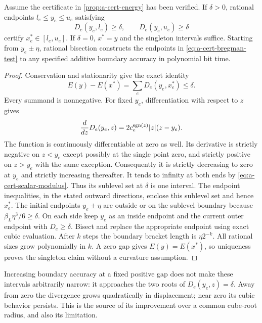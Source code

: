 \begin{proposition}
\label{prop:a-cert-bregman}
Assume the certificate in \cref{prop:a-cert-energy} has been verified.
If $\delta>0$, rational endpoints $l_e\le y_e\le u_e$ satisfying
\begin{equation}
 D_e(y_e,l_e)\ge\delta,\qquad D_e(y_e,u_e)\ge\delta
 \label{eq:a-cert-bregman-test}
\end{equation}
certify $x_e^*\in[l_e,u_e]$. If $\delta=0$, $x^*=y$ and the
singleton intervals suffice. Starting from $y_e\pm\eta$, rational
bisection constructs the endpoints in \eqref{eq:a-cert-bregman-test}
to any specified additive boundary accuracy in polynomial bit time.
\end{proposition}
\begin{proof}
Conservation and stationarity give the exact identity
\begin{equation}
 E(y)-E(x^*)=\sum_e D_e(y_e,x_e^*)\le\delta.
 \label{eq:a-cert-bregman-sum}
\end{equation}
Every summand is nonnegative. For fixed $y_e$, differentiation with
respect to $z$ gives
\[
 \frac{d}{dz}D_e(y_e,z)=2c_e^{\operatorname{sgn}(z)}|z|(z-y_e).
\]
The function is continuously differentiable at zero as well. Its
derivative is strictly negative on $z<y_e$ except possibly at the
single point zero, and strictly positive on $z>y_e$ with the same
exception. Consequently it is strictly decreasing to zero at $y_e$
and strictly increasing thereafter. It tends to infinity at both
ends by \eqref{eq:a-cert-scalar-modulus}. Thus its sublevel set at
$\delta$ is one interval. The endpoint inequalities, in the stated
outward directions, enclose this sublevel set and hence $x_e^*$.
The initial endpoints $y_e\pm\eta$ are outside or on the sublevel
boundary because $\beta_L\eta^3/6\ge\delta$. On each side keep
$y_e$ as an inside endpoint and the current outer endpoint with
$D_e\ge\delta$. Bisect and replace the appropriate endpoint using
exact cubic evaluation. After $k$ steps the boundary bracket length
is $\eta2^{-k}$. All rational sizes grow polynomially in $k$.
A zero gap gives $E(y)=E(x^*)$, so uniqueness proves the singleton
claim without a curvature assumption.
\end{proof}

Increasing boundary accuracy at a fixed positive gap does not make
these intervals arbitrarily narrow: it approaches the two roots of
$D_e(y_e,z)=\delta$. Away from zero the divergence grows quadratically
in displacement; near zero its cubic behavior persists. This is the
source of its improvement over a common cube-root radius, and also
its limitation.

